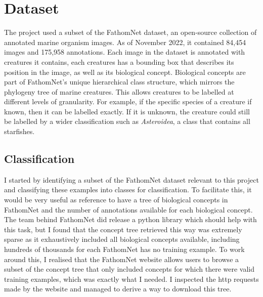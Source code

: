 \documentclass[12pt,a4paper,twoside,openany]{report}
\begin{document}
\section{Dataset}
The project used a subset of the FathomNet \cite{katija_fathomnet_2022} dataset, an open-source collection of annotated marine organism images. As of November 2022, it contained 84,454 images and 175,958 annotations. Each image in the dataset is annotated with creatures it contains, each creatures has a bounding box that describes its position in the image, as well as its biological concept. Biological concepts are part of FathomNet's unique hierarchical class structure, which mirrors the phylogeny tree of marine creatures. This allows creatures to be labelled at different levels of granularity. For example, if the specific species of a creature if known, then it can be labelled exactly. If it is unknown, the creature could still be labelled by a wider classification such as \textit{Asteroidea}, a class that contains all starfishes.

\subsection{Classification}
I started by identifying a subset of the FathomNet dataset relevant to this project and classifying these examples into classes for classification. To facilitate this, it would be very useful as reference to have a tree of biological concepts in FathomNet and the number of annotations available for each biological concept. The team behind FathomNet did release a python library which should help with this task, but I found that the concept tree retrieved this way was extremely sparse as it exhaustively included all biological concepts available, including hundreds of thousands for each FathomNet has no training example. To work around this, I realised that the FathomNet website allows users to browse a subset of the concept tree that only included concepts for which there were valid training examples, which was exactly what I needed. I inspected the http requests made by the website and managed to derive a way to download this tree.
\end{document}
